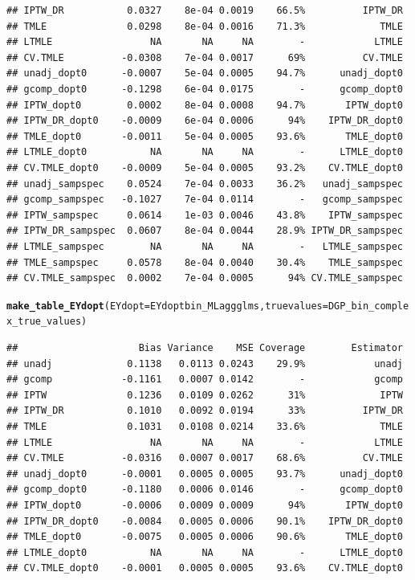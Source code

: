 \documentclass[11pt]{article}\usepackage[]{graphicx}\usepackage[]{color}
\makeatletter
\newcommand{\hlstd}[1]{\textcolor[rgb]{0.345,0.345,0.345}{#1}}%
\newcommand{\hlkwc}[1]{\textcolor[rgb]{0.333,0.667,0.333}{#1}}%
\newcommand{\hlkwd}[1]{\textcolor[rgb]{0.737,0.353,0.396}{\textbf{#1}}}%
\newenvironment{kframe}{%
 \def\at@end@of@kframe{}%
 \ifinner\ifhmode%
  \def\at@end@of@kframe{\end{minipage}}%
  \begin{minipage}{\columnwidth}%
 \fi\fi%
 \def\FrameCommand##1{\hskip\@totalleftmargin \hskip-\fboxsep
 \colorbox{shadecolor}{##1}\hskip-\fboxsep
     \hskip-\linewidth \hskip-\@totalleftmargin \hskip\columnwidth}%
 \MakeFramed {\advance\hsize-\width
   \@totalleftmargin\z@ \linewidth\hsize
   \@setminipage}}%
 {\par\unskip\endMakeFramed%
 \at@end@of@kframe}
\newenvironment{knitrout}{}{} %
\makeatother
\begin{document}
\begin{knitrout}
\begin{kframe}
\begin{verbatim}
## IPTW_DR           0.0327    8e-04 0.0019    66.5%          IPTW_DR
## TMLE              0.0298    8e-04 0.0016    71.3%             TMLE
## LTMLE                 NA       NA     NA        -            LTMLE
## CV.TMLE          -0.0308    7e-04 0.0017      69%          CV.TMLE
## unadj_dopt0      -0.0007    5e-04 0.0005    94.7%      unadj_dopt0
## gcomp_dopt0      -0.1298    6e-04 0.0175        -      gcomp_dopt0
## IPTW_dopt0        0.0002    8e-04 0.0008    94.7%       IPTW_dopt0
## IPTW_DR_dopt0    -0.0009    6e-04 0.0006      94%    IPTW_DR_dopt0
## TMLE_dopt0       -0.0011    5e-04 0.0005    93.6%       TMLE_dopt0
## LTMLE_dopt0           NA       NA     NA        -      LTMLE_dopt0
## CV.TMLE_dopt0    -0.0009    5e-04 0.0005    93.2%    CV.TMLE_dopt0
## unadj_sampspec    0.0524    7e-04 0.0033    36.2%   unadj_sampspec
## gcomp_sampspec   -0.1027    7e-04 0.0114        -   gcomp_sampspec
## IPTW_sampspec     0.0614    1e-03 0.0046    43.8%    IPTW_sampspec
## IPTW_DR_sampspec  0.0607    8e-04 0.0044    28.9% IPTW_DR_sampspec
## LTMLE_sampspec        NA       NA     NA        -   LTMLE_sampspec
## TMLE_sampspec     0.0578    8e-04 0.0040    30.4%    TMLE_sampspec
## CV.TMLE_sampspec  0.0002    7e-04 0.0005      94% CV.TMLE_sampspec
\end{verbatim}
\begin{alltt}
\hlkwd{make_table_EYdopt}\hlstd{(}\hlkwc{EYdopt} \hlstd{= EYdoptbin_MLaggglms,} \hlkwc{truevalues} \hlstd{= DGP_bin_complex_true_values)}
\end{alltt}
\begin{verbatim}
##                     Bias Variance    MSE Coverage        Estimator
## unadj             0.1138   0.0113 0.0243    29.9%            unadj
## gcomp            -0.1161   0.0007 0.0142        -            gcomp
## IPTW              0.1236   0.0109 0.0262      31%             IPTW
## IPTW_DR           0.1010   0.0092 0.0194      33%          IPTW_DR
## TMLE              0.1031   0.0108 0.0214    33.6%             TMLE
## LTMLE                 NA       NA     NA        -            LTMLE
## CV.TMLE          -0.0316   0.0007 0.0017    68.6%          CV.TMLE
## unadj_dopt0      -0.0001   0.0005 0.0005    93.7%      unadj_dopt0
## gcomp_dopt0      -0.1180   0.0006 0.0146        -      gcomp_dopt0
## IPTW_dopt0       -0.0006   0.0009 0.0009      94%       IPTW_dopt0
## IPTW_DR_dopt0    -0.0084   0.0005 0.0006    90.1%    IPTW_DR_dopt0
## TMLE_dopt0       -0.0075   0.0005 0.0006    90.6%       TMLE_dopt0
## LTMLE_dopt0           NA       NA     NA        -      LTMLE_dopt0
## CV.TMLE_dopt0    -0.0001   0.0005 0.0005    93.6%    CV.TMLE_dopt0

\end{verbatim}
\end{kframe}
\end{knitrout}
\end{document}
